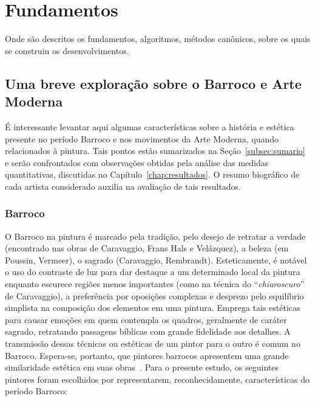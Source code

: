 \chapter{Fundamentos}
\label{cap:fundamentos}

Onde são descritos os fundamentos, algoritmos, métodos canônicos,
sobre os quais se construiu os desenvolvimentos.

\section{Uma breve exploração sobre o Barroco e Arte Moderna}
\label{sec:breve}

É interessante levantar aqui algumas características sobre a história
e estética presente no período Barroco e nos movimentos da Arte
Moderna, quando relacionados à pintura. Tais pontos estão sumarizados
na Seção~\ref{subsec:sumario} e serão confrontados com observações
obtidas pela análise das medidas quantitativas, discutidas no
Capítulo~\ref{chap:resultados}. O resumo biográfico de cada artista
considerado auxilia na avaliação de tais resultados.

\subsection{Barroco}

O Barroco na pintura é marcado pela tradição, pelo desejo de retratar
a verdade (encontrado nas obras de Caravaggio, Frans Hals e
Velázquez), a beleza (em Poussin, Vermeer), o sagrado (Caravaggio,
Rembrandt). Esteticamente, é notável o uso do contraste de luz para
dar destaque a um determinado local da pintura enquanto escurece
regiões menos importantes (como na técnica do ``\textit{chiaroscuro}''
de Caravaggio), a preferência por oposições complexas e desprezo pelo
equilíbrio simplista na composição dos elementos em uma
pintura. Emprega tais estéticas para causar emoções em quem contempla
os quadros, geralmente de caráter sagrado, retratando passagens
bíblicas com grande fidelidade aos detalhes. A transmissão dessas
técnicas ou estéticas de um pintor para o outro é comum no
Barroco. Espera-se, portanto, que pintores barrocos apresentem uma
grande similaridade estética em suas
obras~\cite{gombrich,hills,gardner}. Para o presente estudo, os
seguintes pintores foram escolhidos por representarem,
reconhecidamente, características do período Barroco:

